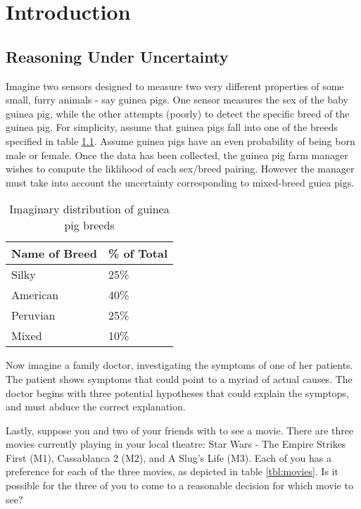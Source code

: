 \documentclass[thesis.tex]{subfiles}
\begin{document}
\chapter{Introduction}



\section{Reasoning Under Uncertainty}

Imagine two sensors designed to measure two very different properties of some
small, furry animals - say guinea pigs. One sensor measures the sex of the baby guinea
pig, while the other attempts (poorly) to detect the specific breed of the guinea pig.
For simplicity, assume that guinea pigs fall into one of the breeds specified in table
\ref{tbl:guinea-pig-breeds}. Assume guinea pigs have an even probability of being born
male or female. Once the data has been collected, the guinea pig farm manager wishes to compute the
liklihood of each sex/breed pairing. However the manager must take into account the
uncertainty corresponding to mixed-breed guiea pigs.

\begin{table}
  \begin{center}
    \begin{tabular}{| l | l |}
      \hline
      Name of Breed & \% of Total \\
      \hline
      Silky         & 25\%        \\
      American      & 40\%        \\
      Peruvian      & 25\%        \\
      Mixed         & 10\%        \\
      \hline
    \end{tabular}
  \end{center}

  \caption{Imaginary distribution of guinea pig breeds}
  \label{tbl:guinea-pig-breeds}
\end{table}

Now imagine a family doctor, investigating the symptoms of one of her patients. The patient
shows symptoms that could point to a myriad of actual causes. The doctor begins with three
potential hypotheses that could explain the symptops, and must abduce the correct explanation.

Lastly, suppose you and two of your friends with to see a movie. There are three movies currently
playing in your local theatre: Star Wars - The Empire Strikes First (M1), Cassablanca 2 (M2), and
A Slug's Life (M3). Each of you has a preference for each of the three movies, as depicted in
table \ref{tbl:movies}. Is it possible for the three of you to come to a reasonable decision for
which movie to see?
\end{document}
